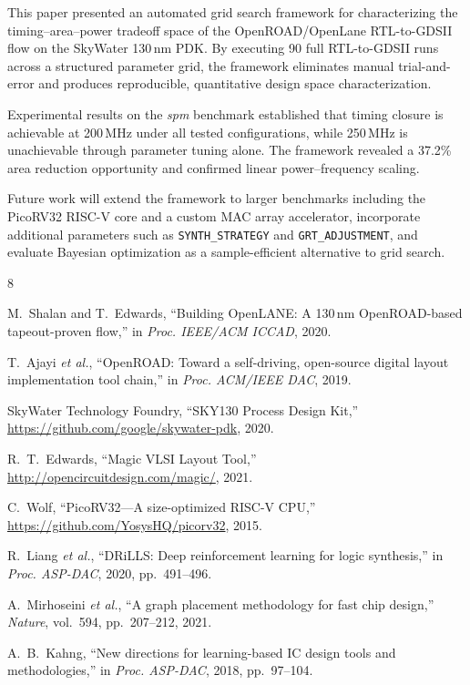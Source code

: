 \documentclass[conference]{IEEEtran}
\begin{document}
This paper presented an automated grid search framework for
characterizing the timing--area--power tradeoff space of the
OpenROAD/OpenLane RTL-to-GDSII flow on the SkyWater 130\,nm PDK. By
executing 90 full RTL-to-GDSII runs across a structured parameter
grid, the framework eliminates manual trial-and-error and produces
reproducible, quantitative design space characterization.

Experimental results on the \textit{spm} benchmark established that
timing closure is achievable at 200\,MHz under all tested
configurations, while 250\,MHz is unachievable through parameter
tuning alone. The framework revealed a 37.2\% area reduction
opportunity and confirmed linear power--frequency scaling.

Future work will extend the framework to larger benchmarks including
the PicoRV32 RISC-V core and a custom MAC array accelerator,
incorporate additional parameters such as \texttt{SYNTH\_STRATEGY}
and \texttt{GRT\_ADJUSTMENT}, and evaluate Bayesian optimization as a
sample-efficient alternative to grid search.

\balance
\begin{thebibliography}{8}

M.~Shalan and T.~Edwards,
``Building OpenLANE: A 130\,nm OpenROAD-based tapeout-proven flow,''
in \textit{Proc. IEEE/ACM ICCAD}, 2020.

T.~Ajayi \textit{et al.},
``OpenROAD: Toward a self-driving, open-source digital layout
implementation tool chain,''
in \textit{Proc. ACM/IEEE DAC}, 2019.

SkyWater Technology Foundry,
``SKY130 Process Design Kit,''
\url{https://github.com/google/skywater-pdk}, 2020.

R.~T.~Edwards,
``Magic VLSI Layout Tool,''
\url{http://opencircuitdesign.com/magic/}, 2021.

C.~Wolf,
``PicoRV32---A size-optimized RISC-V CPU,''
\url{https://github.com/YosysHQ/picorv32}, 2015.

R.~Liang \textit{et al.},
``DRiLLS: Deep reinforcement learning for logic synthesis,''
in \textit{Proc. ASP-DAC}, 2020, pp.~491--496.

A.~Mirhoseini \textit{et al.},
``A graph placement methodology for fast chip design,''
\textit{Nature}, vol.~594, pp.~207--212, 2021.

A.~B.~Kahng,
``New directions for learning-based IC design tools and methodologies,''
in \textit{Proc. ASP-DAC}, 2018, pp.~97--104.

\end{thebibliography}
\end{document}
